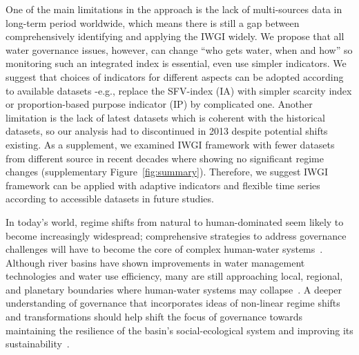 \documentclass[draft]{../agujournal2019}
\begin{document}
One of the main limitations in the approach is the lack of multi-sources data in long-term period worldwide, which means there is still a gap between comprehensively identifying and applying the IWGI widely.
We propose that all water governance issues, however, can change ``who gets water, when and how'' so monitoring such an integrated index is essential, even use simpler indicators.
We suggest that choices of indicators for different aspects can be adopted according to available datasets -e.g., replace the SFV-index (IA) with simpler scarcity index or proportion-based purpose indicator (IP) by complicated one.
Another limitation is the lack of latest datasets which is coherent with the historical datasets, so our analysis had to discontinued in 2013 despite potential shifts existing.
As a supplement, we examined IWGI framework with fewer datasets from different source in recent decades where showing no significant regime changes (supplementary Figure~\ref{fig:summary}).  Therefore, we suggest IWGI framework can be applied with adaptive indicators and flexible time series according to accessible datasets in future studies.

In today's world, regime shifts from natural to human-dominated seem likely to become increasingly widespread; comprehensive strategies to address governance challenges will have to become the core of complex human-water systems~\cite{cumming2018,cumming2014,jaeger2019}.
Although river basins have shown improvements in water management technologies and water use efficiency, many are still approaching local, regional, and planetary boundaries where human-water systems may collapse~\cite{gleeson2020, wang-erlandsson2022}.
A deeper understanding of governance that incorporates ideas of non-linear regime shifts and transformations should help shift the focus of governance towards maintaining the resilience of the basin’s social-ecological system and improving its sustainability~\cite{falkenmark2019}.
\end{document}
